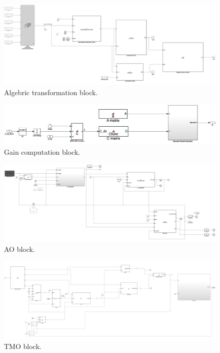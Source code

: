 \documentclass{article}
\begin{document}
\begin{figure}
    \centering
    \includegraphics[angle=90,scale = 0.5]{algebraic_transf_scheme.png}
    \caption{Algebric transformation block.}
    \label{fig:f1}
\end{figure}

\begin{figure}
    \centering
    \includegraphics[angle=90,scale = 0.5]{gain_scheme.png}
    \caption{Gain computation block.}
    \label{fig:f2}
\end{figure}

\begin{figure}
    \centering
    \includegraphics[angle=90,scale = 0.5]{attitude_observer_scheme.png}
    \caption{AO block.}
    \label{fig:f3}
\end{figure}


\begin{figure}
    \centering
    \includegraphics[angle=90,scale = 0.5]{TMO_scheme.png}
    \caption{TMO block.}
    \label{fig:f4}
\end{figure}
\end{document}
